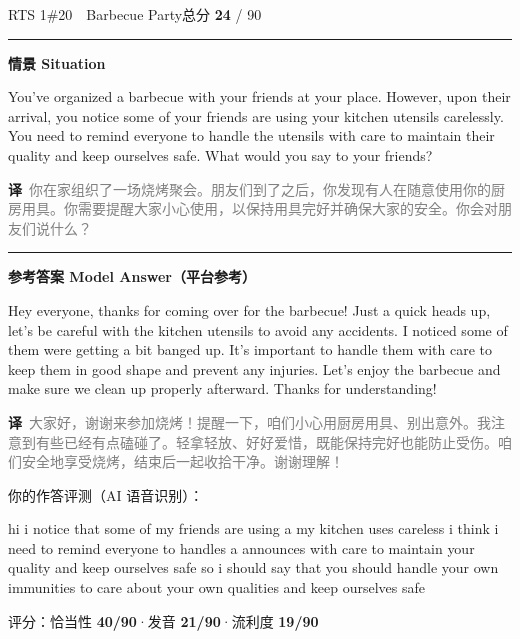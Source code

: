 \documentclass[11pt]{article}
\newcommand{\spart}[1]{\textcolor{cPartial}{\bfseries #1}} %
\newcommand{\szero}[1]{\textcolor{cWrong}{\bfseries #1}}   %
\newcommand{\ptesub}[1]{%
  \par\needspace{2\baselineskip}\smallskip
  {\color{cAccent}\rule[-0.2ex]{3pt}{1.05em}}\hspace{6pt}%
  {\bfseries\color{cHead}#1}\par\nopagebreak\smallskip}
\newcommand{\sg}[1]{\textcolor{cSpkGood}{#1}}   %
\newcommand{\sy}[1]{\textcolor{cSpkOk}{#1}}     %
\newcommand{\sr}[1]{\textcolor{cSpkBad}{#1}}    %
\newcommand{\zh}[1]{{\footnotesize\textcolor{cNote}{\textbf{译}}\ \textcolor{gray}{#1}}}
\begin{document}
\begin{qblock}{RTS 1\quad \#20\ \ Barbecue Party}{总分 \textcolor{cAccent}{\bfseries 24} / 90}
\ptesub{情景 Situation}
\begin{promptbox}
You've organized a barbecue with your friends at your place. However, upon their arrival, you notice some of your friends are using your kitchen utensils carelessly. You need to remind everyone to handle the utensils with care to maintain their quality and keep ourselves safe. What would you say to your friends?
\end{promptbox}
\zh{你在家组织了一场烧烤聚会。朋友们到了之后，你发现有人在随意使用你的厨房用具。你需要提醒大家小心使用，以保持用具完好并确保大家的安全。你会对朋友们说什么？}
\ptesub{参考答案 Model Answer（平台参考）}
\begin{modelbox}
Hey everyone, thanks for coming over for the barbecue! Just a quick heads up, let's be careful with the kitchen utensils to avoid any accidents. I noticed some of them were getting a bit banged up. It's important to handle them with care to keep them in good shape and prevent any injuries. Let's enjoy the barbecue and make sure we clean up properly afterward. Thanks for understanding!
\end{modelbox}
\zh{大家好，谢谢来参加烧烤！提醒一下，咱们小心用厨房用具、别出意外。我注意到有些已经有点磕碰了。轻拿轻放、好好爱惜，既能保持完好也能防止受伤。咱们安全地享受烧烤，结束后一起收拾干净。谢谢理解！}
\smallskip\par{\footnotesize\color{gray}你的作答评测（AI 语音识别）：}
\begin{asrbox}
\sg{hi} \sr{i} \sg{notice that} \sr{some} \sg{of my friends are using} \sy{a} \sg{my kitchen} \sy{uses} \sy{careless i think i need to remind everyone to handles a} \sr{announces} \sg{with care} \sg{to maintain} \sy{your quality and} \sy{keep ourselves safe so i should say that you should handle your own} \sy{immunities to care about your own qualities and keep ourselves} \sy{safe}
\end{asrbox}
{\small 评分：恰当性 \spart{40/90}\quad·\quad 发音 \szero{21/90}\quad·\quad 流利度 \szero{19/90}}
\end{qblock}
\end{document}
